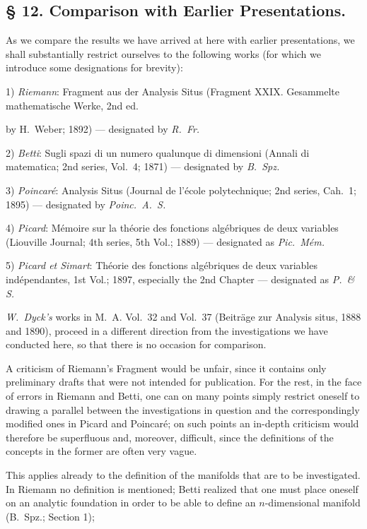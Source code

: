 \documentclass{article}
\begin{document}
\subsection*{§ 12. Comparison with Earlier Presentations.}

As we compare the results we have arrived at here with earlier presentations, we shall substantially restrict ourselves to the following works (for which we introduce some designations for brevity):

1) \emph{Riemann}: Fragment aus der Analysis Situs (Fragment XXIX. Gesammelte mathematische Werke, 2nd ed.

by H.~Weber; 1892) --- designated by \emph{R.~Fr.}

2) \emph{Betti}: Sugli spazi di un numero qualunque di dimensioni (Annali di matematica; 2nd series, Vol.\ 4; 1871) --- designated by \emph{B.~Spz.}

3) \emph{Poincaré}: Analysis Situs (Journal de l'école polytechnique; 2nd series, Cah.\ 1; 1895) --- designated by \emph{Poinc.~A.~S.}

4) \emph{Picard}: Mémoire sur la théorie des fonctions algébriques de deux variables (Liouville Journal; 4th series, 5th Vol.; 1889) --- designated as \emph{Pic.~Mém.}

5) \emph{Picard et Simart}: Théorie des fonctions algébriques de deux variables indépendantes, 1st Vol.; 1897, especially the 2nd Chapter --- designated as \emph{P.\ \& S.}

\emph{W.~Dyck's} works in M.~A. Vol.\ 32 and Vol.\ 37 (Beiträge zur Analysis situs, 1888 and 1890), proceed in a different direction from the investigations we have conducted here, so that there is no occasion for comparison.

A criticism of Riemann's Fragment would be unfair, since it contains only preliminary drafts that were not intended for publication. For the rest, in the face of errors in Riemann and Betti, one can on many points simply restrict oneself to drawing a parallel between the investigations in question and the correspondingly modified ones in Picard and Poincaré; on such points an in-depth criticism would therefore be superfluous and, moreover, difficult, since the definitions of the concepts in the former are often very vague.

This applies already to the definition of the manifolds that are to be investigated. In Riemann no definition is mentioned; Betti realized that one must place oneself on an analytic foundation in order to be able to define an $n$-dimensional manifold (B.~Spz.; Section 1);
\end{document}
